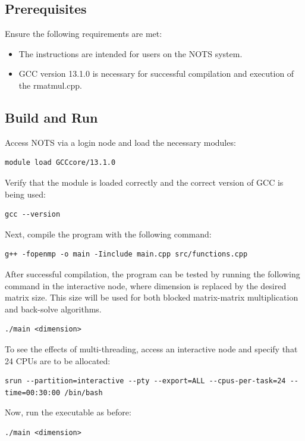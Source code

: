 \documentclass{article}
\begin{document}
\subsection{Prerequisites}
Ensure the following requirements are met:
\begin{itemize}
    \item The instructions are intended for users on the NOTS system.
    \item GCC version 13.1.0 is necessary for successful compilation and execution of the rmatmul.cpp.
\end{itemize}
\subsection{Build and Run}
Access NOTS via a login node and load the necessary modules:
\begin{verbatim}
module load GCCcore/13.1.0
\end{verbatim}
Verify that the module is loaded correctly and the correct version of GCC is being used:
\begin{verbatim}gcc --version\end{verbatim}
Next, compile the program with the following command:
\begin{verbatim}
g++ -fopenmp -o main -Iinclude main.cpp src/functions.cpp
\end{verbatim}
After successful compilation, the program can be tested by running the following command in the interactive node, where dimension is replaced by the desired matrix size. This size will be used for both blocked matrix-matrix multiplication and back-solve algorithms.
\begin{verbatim}
./main <dimension>
\end{verbatim}
To see the effects of multi-threading, access an interactive node and specify that 24 CPUs are to be allocated:
\begin{verbatim}
srun --partition=interactive --pty --export=ALL --cpus-per-task=24 --time=00:30:00 /bin/bash
\end{verbatim}
Now, run the executable as before:
\begin{verbatim}
./main <dimension>
\end{verbatim}
\end{document}
